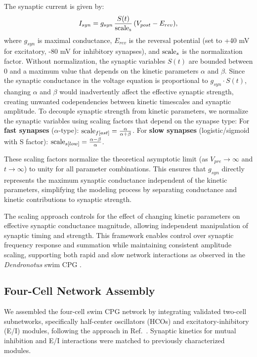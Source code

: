 \documentclass[nofootinbib,aip,amsmath,amssymb,preprint,twocolumn,floatfix,10pt]{revtex4-2}
\begin{document}
The synaptic current is given by:
\begin{equation}
  I_{syn} = g_{syn}\, \frac{S(t)}{\rm scale_s}\, (V_{post}-E_{rev}),
\end{equation}
where $g_{syn}$ is maximal conductance, $E_{rev}$ is the reversal potential (set to +40 mV for excitatory, -80 mV for inhibitory synapses), and ${\rm scale}_s$ is the normalization factor.
Without normalization, the synaptic variables $S(t)$ are bounded between 0 and a maximum value that depends on the kinetic parameters $\alpha$ and $\beta$. Since the synaptic conductance in the voltage equation is proportional to $g_{syn} \cdot S(t)$, changing $\alpha$ and $\beta$ would inadvertently affect the effective synaptic strength, creating unwanted codependencies between kinetic timescales and synaptic amplitude. To decouple synaptic strength from kinetic parameters, we normalize the synaptic variables using scaling factors that depend on the synapse type:
For \textbf{fast synapses} ($\alpha$-type): ${\rm scale}_{f[ast]} = \frac{\alpha}{\alpha + \beta}$.
For \textbf{slow synapses} (logistic/sigmoid with S factor): ${\rm scale}_{s[low]} = \frac{\alpha - \beta}{\alpha}$.

These scaling factors normalize the theoretical asymptotic limit (as $V_{pre} \to \infty$ and $t \to \infty$) to unity for all parameter combinations. This ensures that $g_{syn}$ directly represents the maximum synaptic conductance independent of the kinetic parameters, simplifying the modeling process by separating conductance and kinetic contributions to synaptic strength.

The scaling approach controls for the effect of changing kinetic parameters on effective synaptic conductance magnitude, allowing independent manipulation of synaptic timing and strength. This framework enables control over synaptic frequency response and summation while maintaining consistent amplitude scaling, supporting both rapid and slow network interactions as observed in the \textit{Dendronotus} swim CPG \cite{SakuraiKatz2016}.

\subsection{Four-Cell Network Assembly}

We assembled the four-cell swim CPG network by integrating validated two-cell subnetworks, specifically half-center oscillators (HCOs) and excitatory-inhibitory (E/I) modules, following the approach in Ref.~\cite{scully2024pairing}. Synaptic kinetics for mutual inhibition and E/I interactions were matched to previously characterized modules.
\end{document}
